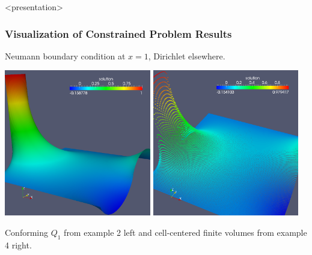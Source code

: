 \begin{frame}<presentation>
\frametitle{Visualization of Constrained Problem Results}
Neumann boundary condition at $x=1$, Dirichlet elsewhere.

\begin{center}
\includegraphics[width=0.48\textwidth]{./EPS/example02_Q1} \hspace{1mm}
\includegraphics[width=0.48\textwidth]{./EPS/example04}
\end{center}

Conforming $Q_1$ from example 2 left and cell-centered finite volumes from example 4 right.
\end{frame}

